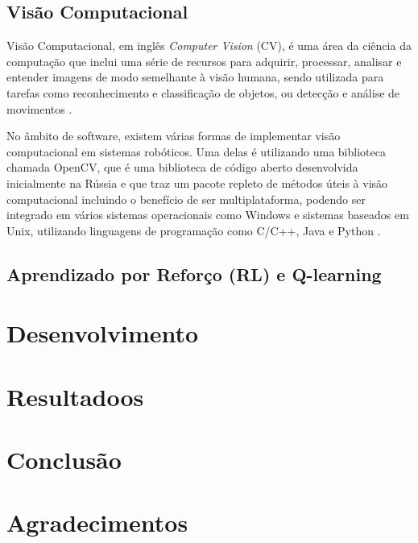 \documentclass[a4paper]{ifacconf}
\begin{document}
\subsection{Visão Computacional}

Visão Computacional, em inglês \textit{Computer Vision} (CV), é uma área da ciência da computação que inclui uma série de recursos para adquirir, processar, analisar e entender imagens de modo semelhante à visão humana, sendo utilizada para tarefas como reconhecimento e classificação de objetos, ou detecção e análise de movimentos \cite{comp_vis}.

No âmbito de software, existem várias formas de implementar visão computacional em sistemas robóticos. Uma delas é utilizando uma biblioteca chamada OpenCV, que é uma biblioteca de código aberto desenvolvida inicialmente na Rússia e que traz um pacote repleto de métodos úteis à visão computacional incluindo o benefício de ser multiplataforma, podendo ser integrado em vários sistemas operacionais como Windows e sistemas baseados em Unix, utilizando linguagens de programação como C/C++, Java e Python \cite{comp_vis,ocv_ref}.



\subsection{Aprendizado por Reforço (RL) e Q-learning}


\section{Desenvolvimento}


\section{Resultadoos}


\section{Conclusão}




\section*{Agradecimentos}


                                                   
\end{document}
